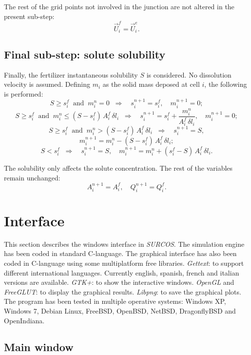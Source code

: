 \documentclass[review,authoryear]{elsarticle}
\newcommand{\eq}[2]{\begin{equation}\label{#2}#1\end{equation}}
\newcommand{\PA}[1] {\left(#1\right)}
\begin{document}
The rest of the grid points not involved in the junction are not altered in the
present sub-step:
\eq{\vec{U}_i^f=\vec{U}_i^e.}{EqJunctionPoint}

\subsection{Final sub-step: solute solubility}

Finally, the fertilizer instantaneous solubility $S$ is considered. No
dissolution velocity is assumed. Defining $m_i$ as the solid mass deposed at
cell $i$, the following is performed:
\[
	S\geq s_i^f\;\;\mathrm{and}\;\;m_i^n=0\;\;\Rightarrow\quad
	s_i^{n+1}=s_i^f,\quad m_i^{n+1}=0;
\]
\[
	S\geq s_i^f\;\;\mathrm{and}\;\;m_i^n\leq\PA{S-s_i^f}\,A_i^f\,\delta l_i\;\;
	\Rightarrow\quad
	s_i^{n+1}=s_i^f+\frac{m_i^n}{A_i^f\,\delta l_i},\quad m_i^{n+1}=0;
\]
\[
	S\geq s_i^f\;\;\mathrm{and}\;\;m_i^n>\PA{S-s_i^f}\,A_i^f\,\delta l_i\;\;
	\Rightarrow\quad s_i^{n+1}=S,
\]
\[m_i^{n+1}=m_i^n-\PA{S-s_i^f}\,A_i^f\,\delta l_i;\]
\eq
{
	S<s_i^f\;\;\Rightarrow\quad
	s_i^{n+1}=S,\quad m_i^{n+1}=m_i^n+\PA{s_i^f-S}\,A_i^f\,\delta l_i.
}{EqSolubility}

The solubility only affects the solute concentration. The rest of the variables
remain unchanged:
\eq{A_i^{n+1}=A_i^f,\quad Q_i^{n+1}=Q_i^f.}{EqSolubilityPoint}

\section{Interface}

This section describes the windows interface in \emph{SURCOS}. The simulation
engine has been coded in standard C-language. The graphical interface has also
been coded in C-language using some multiplatform free libraries.
\emph{Gettext}: to support different international languages. Currently english,
spanish, french and italian versions are available.
\emph{GTK+}: to show the interactive windows.
\emph{OpenGL} and \emph{FreeGLUT}: to display the graphical results.
\emph{Libpng}: to save the graphical plots.
The program has been tested in multiple operative systems: Windows
XP\footnotemark[1], Windows 7\footnotemark[1], Debian Linux, FreeBSD, OpenBSD,
NetBSD, DragonflyBSD and OpenIndiana.


\subsection{Main window}
\end{document}
